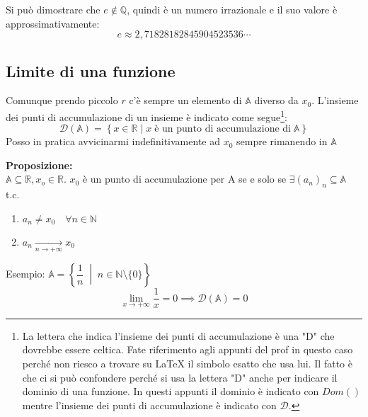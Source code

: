 Si può dimostrare che $e \notin \mathbb{Q}$, quindi è un numero irrazionale e il suo valore è approssimativamente:
\begin{equation*}
    e \approx 2,71828 18284 59045 23536 \cdots
\end{equation*}

\subsection{Limite di una funzione}

\dfn{
\textbf{Intorno sferico di un punto} $x_0 \in \mathbb{R}$ di raggio $r$:
    \begin{equation*}
        x_0 \in \mathbb{R}, r\in \mathbb{R} : r > 0
    \end{equation*}
    \begin{equation*}
        I_r (x_o) = \left\{x\in \mathbb{R} : \; |x-x_0| < r \right\}
    \end{equation*}
    Che in pratica risulta:
    \begin{equation*}
        I_r (x_0) = ]x_0-r, x_0+r[
    \end{equation*}
}

Comunque prendo piccolo $r$ c'è sempre un elemento di $\mathbb{A}$ diverso da $x_0$. L'insieme dei punti di accumulazione di un insieme è indicato come segue\footnote{La lettera che indica l'insieme dei punti di accumulazione è una "D" che dovrebbe essere celtica. Fate riferimento agli appunti del prof in questo caso perché non riesco a trovare su \LaTeX\; il simbolo esatto che usa lui. Il fatto è che ci si può confondere perché si usa la lettera "D" anche per indicare il dominio di una funzione. In questi appunti il dominio è indicato con $Dom()$ mentre l'insieme dei punti di accumulazione è indicato con $\mathcal{D}$.}:
\begin{equation*}
	\mathcal{D} (\mathbb{A}) = \left\{ x \in \mathbb{R}\; |\; x\; \text{è un punto di accumulazione di}\; \mathbb{A} \right\}
\end{equation*}
Posso in pratica avvicinarmi indefinitivamente ad $x_0$ sempre rimanendo in $\mathbb{A}$

\textbf{Proposizione:}\\
$\mathbb{A} \subseteq \mathbb{R}, x_o \in \mathbb{R}$. $x_0$ è un punto di accumulazione per A se e solo se $\exists (a_n)_n \subseteq \mathbb{A}$ t.c.
\begin{enumerate}
	\item $a_n \neq x_0 \quad \forall n \in \mathbb{N}$
	\item $a_n \xrightarrow[n\to +\infty]{} x_0$
\end{enumerate}
Esempio:
$\mathbb{A} = \left\{\dfrac{1}{n} \;\middle|\; n \in \mathbb{N} \setminus \{0\} \right\}$
\begin{equation*}
    \lim_{x\to + \infty} \dfrac{1}{x} = 0 \implies \mathcal{D}(\mathbb{A}) = {0}
\end{equation*}

